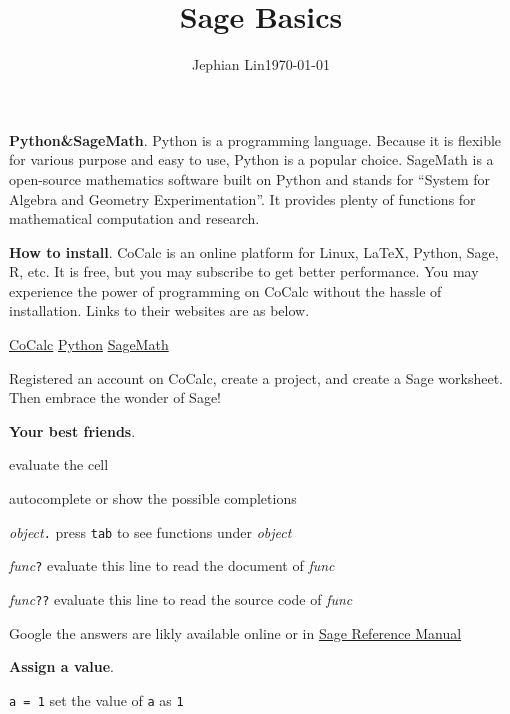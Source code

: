 \documentclass{article}
\title{Sage Basics}
\author{Jephian Lin\hspace{2cm}\today}
\date{\vspace{-1cm}}
\newcommand{\heading}[1]{\medskip\textbf{#1}.}
\newenvironment{lwdes}{\begin{description}[leftmargin=1.7cm,align=left,labelwidth=1.5cm]}{\end{description}}
\begin{document}
\maketitle

\large

\begin{multicols}{2}
\heading{Python\&SageMath}  Python is a programming language.  Because it is flexible for various purpose and easy to use, Python is a popular choice.  SageMath is a open-source mathematics software built on Python and stands for ``System for Algebra and Geometry Experimentation''.  It provides plenty of functions for mathematical computation and research.

\heading{How to install}  CoCalc is an online platform for Linux, \LaTeX{}, Python, Sage, R, etc.  It is free, but you may subscribe to get better performance.  You may experience the power of programming on CoCalc without the hassle of installation.  Links to their websites are as below.
\begin{center}
\href{https://cocalc.com/}{CoCalc}
\hfil
\href{https://www.python.org/}{Python}
\hfil
\href{http://www.sagemath.org/}{SageMath}
\end{center}
Registered an account on CoCalc, create a project, and create a Sage worksheet.  Then embrace the wonder of Sage!

\heading{Your best friends}
\begin{lwdes}
\item[\stackanchor{\keys{shift}}{+\keys{enter}}] evaluate the cell
\item[\keys{tab}] autocomplete or show the possible completions
\item[\textit{object}\texttt{.}] press \texttt{tab} to see functions under \textit{object}
\item[\textit{func}\texttt{?}] evaluate this line to read the document of \textit{func}
\item[\textit{func}\texttt{??}] evaluate this line to read the source code of \textit{func} 
\item[Google] the answers are likly available online or in \href{https://doc.sagemath.org/html/en/reference/}{Sage Reference Manual}
\end{lwdes}

\heading{Assign a value}
\begin{lwdes}
\item[\texttt{a = 1}] set the value of \texttt{a} as \texttt{1}
\end{lwdes}


\end{multicols}
\end{document}
